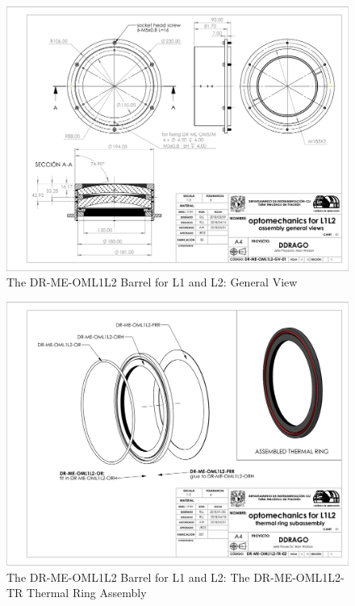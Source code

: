 \documentclass{article}
\begin{document}
\begin{figure}
\begin{center}
\includegraphics[height=\linewidth,angle=90]{figures/DR-ME-OML1L2-GV-01}
\end{center}
\caption{The DR-ME-OML1L2 Barrel for L1 and L2: General View}
\label{figure:rosalia-oml1l2-general}
\end{figure}

\begin{figure}
\begin{center}
\includegraphics[height=\linewidth,angle=90]{figures/DR-ME-OML1L2-TR-02}
\end{center}
\caption{The DR-ME-OML1L2 Barrel for L1 and L2: The DR-ME-OML1L2-TR Thermal Ring Assembly}
\label{figure:rosalia-oml1l2-thermal-ring}
\end{figure}
\end{document}

